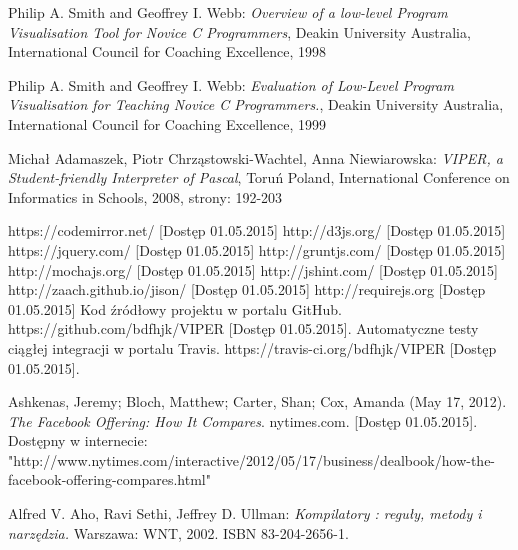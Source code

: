 \documentclass[a4paper,twoside,openright,11pt]{report}
\begin{document}
\begin{thebibliography}{99}
  
   Philip A. Smith and Geoffrey I. Webb: \emph{Overview of a low-level Program Visualisation Tool for Novice C Programmers}, Deakin University Australia, International Council for Coaching Excellence, 1998 
  
   Philip A. Smith and Geoffrey I. Webb: \emph{Evaluation of Low-Level Program Visualisation for Teaching Novice C Programmers.}, Deakin University Australia, International Council for Coaching Excellence, 1999
  
   Michał Adamaszek, Piotr Chrząstowski-Wachtel, Anna Niewiarowska: \emph{VIPER, a Student-friendly Interpreter of Pascal}, Toruń Poland, International Conference on Informatics in Schools, 2008, strony: 192-203 
  
   https://codemirror.net/ [Dostęp 01.05.2015]
   http://d3js.org/ [Dostęp 01.05.2015]
   https://jquery.com/ [Dostęp 01.05.2015]
   http://gruntjs.com/ [Dostęp 01.05.2015]
   http://mochajs.org/ [Dostęp 01.05.2015]
   http://jshint.com/ [Dostęp 01.05.2015]
   http://zaach.github.io/jison/ [Dostęp 01.05.2015]
   http://requirejs.org [Dostęp 01.05.2015]
   Kod źródłowy projektu w portalu GitHub. https://github.com/bdfhjk/VIPER [Dostęp 01.05.2015]. 
   Automatyczne testy ciągłej integracji w portalu Travis. https://travis-ci.org/bdfhjk/VIPER [Dostęp 01.05.2015].

   Ashkenas, Jeremy; Bloch, Matthew; Carter, Shan; Cox, Amanda (May 17, 2012). \emph{The Facebook Offering: How It Compares}. nytimes.com.  [Dostęp 01.05.2015]. Dostępny w internecie: "http://www.nytimes.com/interactive/2012/05/17/business/dealbook/how-the-facebook-offering-compares.html"
  
   Alfred V. Aho, Ravi Sethi, Jeffrey D. Ullman: \emph{Kompilatory : reguły, metody i narzędzia.} Warszawa: WNT, 2002. ISBN 83-204-2656-1.


\end{thebibliography}
\end{document}

